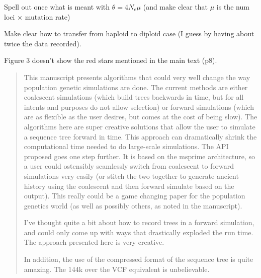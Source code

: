 \begin{point}{}
  Spell out once what is meant with $\theta = 4N_e\mu$ (and make clear that $\mu$ is
  the num loci $\times$ mutation rate)
\end{point}



\begin{point}{}
  Make clear how to transfer from haploid to diploid case (I guess by having
  about twice the data recorded).
\end{point}


\begin{point}{}
  Figure 3 doesn't show the red stars mentioned in the main text (p8).
\end{point}






\begin{quote}
    This manuscript presents algorithms that could very well change the way
    population genetic simulations are done. The current methods are either
    coalescent simulations (which build trees backwards in time, but for all
    intents and purposes do not allow selection) or forward simulations (which are
    as flexible as the user desires, but comes at the cost of being slow). The
    algorithms here are super creative solutions that allow the user to simulate a
    sequence tree forward in time. This approach can dramatically shrink the
    computational time needed to do large-scale simulations. The API proposed goes
    one step further. It is based on the msprime architecture, so a user could
    ostensibly seamlessly switch from coalescent to forward simulations very easily
    (or stitch the two together to generate ancient history using the coalescent
    and then forward simulate based on the output). This really could be a game
    changing paper for the population genetics world (as well as possibly others,
    as noted in the manuscript).

    I've thought quite a bit about how to record trees in a forward simulation, and
    could only come up with ways that drastically exploded the run time. The
    approach presented here is very creative.

    In addition, the use of the compressed format of the sequence tree is quite
    amazing. The 144k over the VCF equivalent is unbelievable.
\end{quote}

